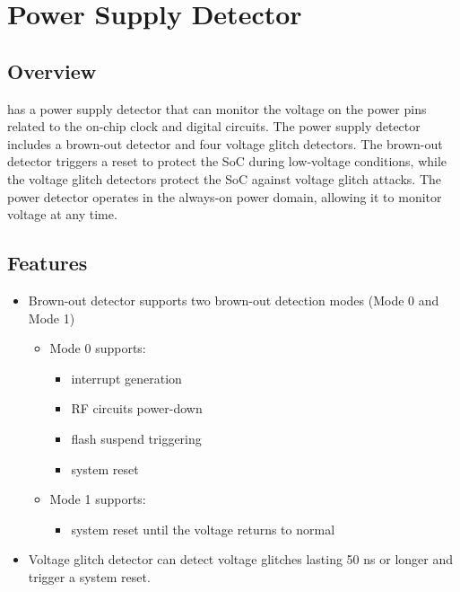 \documentclass[main\_\_EN.tex]{subfiles}
\begin{document}

\ifglobal
\else
    {\let\clearpage\relax \listoftodos}
    {\let\clearpage\relax \listofdonetodos}
    \tableofcontents
\fi



\hypertarget{psdet}{}
\chapter{Power Supply Detector}
\label{mod:psdet}

\section{Overview}

\chipname{} has a power supply detector that can monitor the voltage on the power pins related to the on-chip clock and digital circuits. The power supply detector includes a brown-out detector and four voltage glitch detectors. The brown-out detector triggers a reset to protect the SoC during low-voltage conditions, while the voltage glitch detectors protect the SoC against voltage glitch attacks. The power detector operates in the always-on power domain, allowing it to monitor voltage at any time.


\section{Features}
\label{sec:psdet-features}

\begin{itemize}
    \item Brown-out detector supports two brown-out detection modes (Mode 0 and Mode 1)
    \begin{itemize}
        \item Mode 0 supports:
            \begin{itemize}
            \item interrupt generation
            \item RF circuits power-down
            \item flash suspend triggering
            \item system reset
            \end{itemize}
        \item Mode 1 supports:
            \begin{itemize}
            \item system reset until the voltage returns to normal
            \end{itemize}
    \end{itemize}
    \item Voltage glitch detector can detect voltage glitches lasting 50 ns or longer and trigger a system reset.
\end{itemize}
\end{document}
